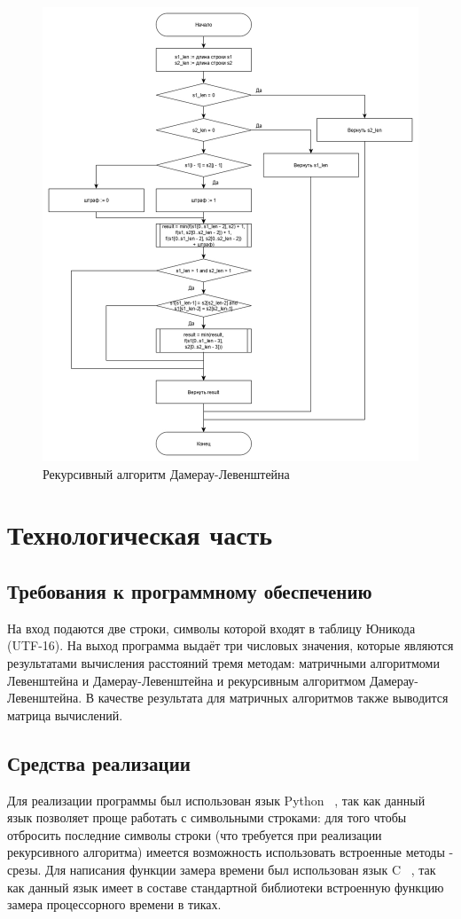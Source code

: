 \documentclass[14pt, a4paper]{report}
\begin{document}
	\begin{figure}
		\centering
		\includegraphics[scale=0.5]{damleven_r}
		\caption{Рекурсивный алгоритм Дамерау-Левенштейна}
		\label{fig:damlevenr}
	\end{figure}

	\newpage
	
	\chapter{Технологическая часть}
	\section{Требования к программному обеспечению}
	На вход подаются две строки, символы которой входят в таблицу Юникода (UTF-16). На выход программа выдаёт три числовых значения, которые являются результатами вычисления расстояний тремя методам: матричными алгоритмоми Левенштейна и Дамерау-Левенштейна и рекурсивным алгоритмом Дамерау-Левенштейна. В качестве результата для матричных алгоритмов также выводится матрица вычислений.
	\section{Средства реализации}
	Для реализации программы был использован язык Python ~\cite{Python}, так как данный язык позволяет проще работать с символьными строками: для того чтобы отбросить последние символы строки (что требуется при реализации рекурсивного алгоритма) имеется возможность использовать встроенные методы - срезы. Для написания функции замера времени был использован язык C ~\cite{C}, так как данный язык имеет в составе стандартной библиотеки встроенную функцию замера процессорного времени в тиках.
\end{document}
